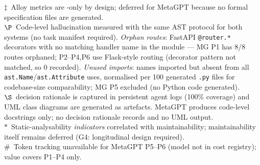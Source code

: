 \begin{table}[t]
\begin{minipage}{\textwidth}
$\ddagger$~Alloy metrics are \as\space-only by design; deferred for MetaGPT because no formal specification files are generated.\\
$\P$~Code-level hallucination measured with the same AST protocol for both systems (no task manifest required). \emph{Orphan routes}: FastAPI \texttt{@router.*} decorators with no matching handler name in the module --- MG P1 has 8/8 routes orphaned; P2--P4,P6 use Flask-style routing (decorator pattern not matched, so 0 recorded). \emph{Unused imports}: names imported but absent from all \texttt{ast.Name}/\texttt{ast.Attribute} uses, normalised per 100 generated \texttt{.py} files for codebase-size comparability; MG P5 excluded (no Python code generated).\\
$\S$~\as\space decision rationale is captured in persistent agent logs (100\% coverage) and UML class diagrams are generated as artefacts. MetaGPT produces code-level docstrings only; no decision rationale records and no UML output.\\
$\ast$~Static-analysability \emph{indicators} correlated with maintainability; maintainability itself remains deferred (G4: longitudinal design required).\\
$\#$~Token tracking unavailable for MetaGPT P5--P6 (model not in cost registry); value covers P1--P4 only.
\end{minipage}
\end{table}
